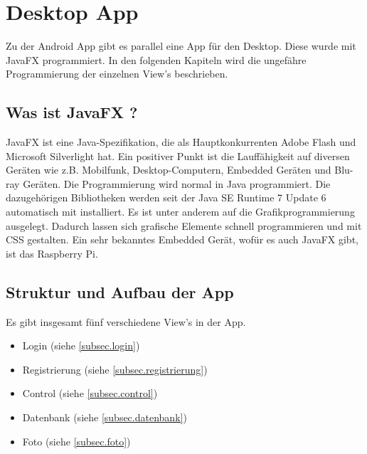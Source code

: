 
\chapter{Desktop App}
Zu der Android App gibt es parallel eine App für den Desktop. Diese wurde mit JavaFX  programmiert. In den folgenden Kapiteln wird die ungefähre Programmierung der einzelnen View's beschrieben.

				
				
\section{Was ist JavaFX ?}
JavaFX ist eine Java-Spezifikation, die als Hauptkonkurrenten Adobe Flash und Microsoft Silverlight hat. Ein positiver Punkt ist die Lauffähigkeit auf diversen Geräten wie z.B. Mobilfunk, Desktop-Computern, Embedded Geräten und Blu-ray Geräten. Die Programmierung wird normal in Java programmiert. Die dazugehörigen Bibliotheken werden seit der Java SE Runtime 7 Update 6 automatisch mit installiert. Es ist unter anderem auf die Grafikprogrammierung ausgelegt. Dadurch lassen sich grafische Elemente schnell programmieren und mit CSS gestalten.
Ein sehr bekanntes Embedded Gerät, wofür es auch JavaFX gibt, ist das Raspberry Pi. \cite{bib.jFXRaspPi}

\section{Struktur und Aufbau der App}
Es gibt insgesamt fünf verschiedene View's in der App.
\begin{itemize}
	\item Login (siehe \ref{subsec.login})
	\item Registrierung (siehe \ref{subsec.registrierung})
	\item Control (siehe \ref{subsec.control})
	\item Datenbank (siehe \ref{subsec.datenbank})
	\item Foto (siehe \ref{subsec.foto})
\end{itemize}

